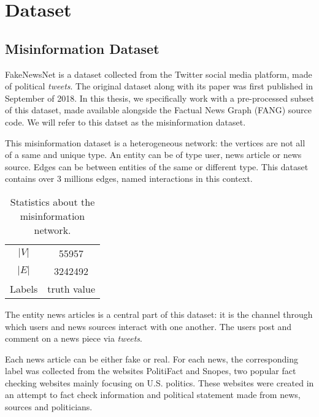 
\chapter{Dataset} %
\label{cha:Dataset}

\section{Misinformation Dataset}

FakeNewsNet is a dataset collected from the Twitter social media platform, made of political \textit{tweets}.
The original dataset along with its paper was first published in September of 2018.
In this thesis, we specifically work with a pre-processed subset of this dataset, made available alongside the Factual News Graph (FANG) source code. We will refer to this datset as the misinformation dataset.

This misinformation dataset is a heterogeneous network: the vertices are not all of a same and unique type.
An entity can be of type user, news article or news source.
Edges can be between entities of the same or different type.
This dataset contains over 3 millions edges, named interactions in this context.

\begin{table}[h]
    \centering
    \caption{Statistics about the misinformation network.}
    \label{tab:dataset:network}
    \begin{tabular}{cc}
        \toprule
        $|V|$ & 55957\\
        $|E|$ & 3242492\\
        Labels & truth value\\
        \bottomrule
    \end{tabular}
\end{table}

The entity news articles is a central part of this dataset: it is the channel through which users and news sources interact with one another.
The users post and comment on a news piece via \textit{tweets}.

Each news article can be either fake or real. 
For each news, the corresponding label was collected from the websites PolitiFact and Snopes, two popular fact checking websites mainly focusing on U.S. politics.
These websites were created in an attempt to fact check information and political statement made from news, sources and politicians.

